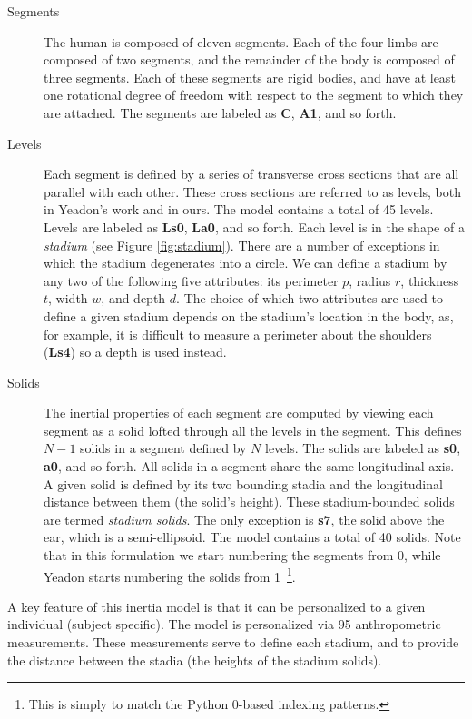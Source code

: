 \documentclass[10pt]{article}
\begin{document}
\begin{description}
  \item[Segments]
    The human is composed of eleven segments. Each of the four limbs are
    composed of two segments, and the remainder of the body is composed of
    three segments. Each of these segments are rigid bodies, and have at least
    one rotational degree of freedom with respect to the segment to which they
    are attached. The segments are labeled as \textbf{C}, \textbf{A1}, and so
    forth.
  \item[Levels]
    Each segment is defined by a series of transverse cross sections that are
    all parallel with each other.  These cross sections are referred to as
    levels, both in Yeadon's work and in ours. The model contains a total of 45
    levels. Levels are labeled as \textbf{Ls0}, \textbf{La0}, and so forth.
    Each level is in the shape of a \emph{stadium} (see Figure
    \ref{fig:stadium}). There are a number of exceptions in which the stadium
    degenerates into a circle. We can define a stadium by any two of the
    following five attributes: its perimeter $p$, radius $r$, thickness $t$,
    width $w$, and depth $d$. The choice of which two attributes are used to
    define a given stadium depends on the stadium's location in the body, as,
    for example, it is difficult to measure a perimeter about the shoulders
    (\textbf{Ls4}) so a depth is used instead.
  \item[Solids]
    The inertial properties of each segment are computed by viewing each
    segment as a solid lofted through all the levels in the segment. This
    defines $N-1$ solids in a segment defined by $N$ levels. The solids are
    labeled as \textbf{s0}, \textbf{a0}, and so forth. All solids in a segment
    share the same longitudinal axis. A given solid is defined by its two
    bounding stadia and the longitudinal distance between them (the solid's
    height). These stadium-bounded solids are termed \emph{stadium solids}. The
    only exception is \textbf{s7}, the solid above the ear, which is a
    semi-ellipsoid. The model contains a total of 40 solids. Note that in this
    formulation we start numbering the segments from 0, while Yeadon starts
    numbering the solids from 1~\footnote{This is simply to match the Python
    0-based indexing patterns.}.
\end{description}

A key feature of this inertia model is that it can be personalized to a given
individual (subject specific). The model is personalized via 95
anthropometric measurements. These measurements serve to define each stadium,
and to provide the distance between the stadia (the heights of the stadium
solids).
\end{document}
